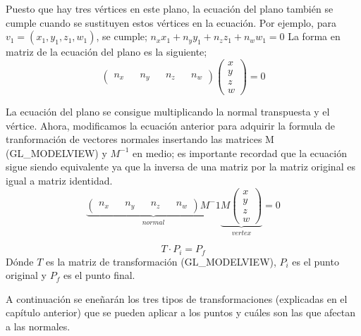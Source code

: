 Puesto que hay tres vértices en este plano, la ecuación del plano también se cumple cuando se sustituyen estos vértices en la ecuación. Por ejemplo, para $v_1 = (x_1,y_1,z_1,w_1)$, se cumple; $n_xx_1 + n_yy_1+n_zz_1+n_ww_1=0$
La forma en matriz de la ecuación del plano es la siguiente;
\[
\begin{pmatrix}
  n_x && n_y && n_z && n_w
\end{pmatrix}
\begin{pmatrix}
  x \\ y \\ z \\ w
\end{pmatrix}
= 0
\]

La ecuación del plano se consigue multiplicando la normal transpuesta y el vértice.
Ahora, modificamos la ecuación anterior para adquirir la formula de tranformación de vectores normales insertando las matrices M (GL\_MODELVIEW) y $M^{-1}$ en medio; es importante recordad que la ecuación sigue siendo equivalente ya que la inversa de una matriz por la matriz original es igual a matriz identidad.
\[
\underbrace{\begin{pmatrix}
  n_x && n_y && n_z && n_w
\end{pmatrix}M^-1}_{normal}\underbrace{M
\begin{pmatrix}
  x \\ y \\ z \\ w
\end{pmatrix}}_{vertex}
= 0
\]

\begin{equation*}
  T \cdot P_i = P_f 
\end{equation*}
Dónde $T$ es la matriz de transformación (GL\_MODELVIEW), $P_i$ es el punto original y $P_f$ es el punto final.

A continuación se eneñarán los tres tipos de transformaciones (explicadas en el capítulo anterior) que se pueden aplicar a los puntos y cuáles son las que afectan a las normales. 

